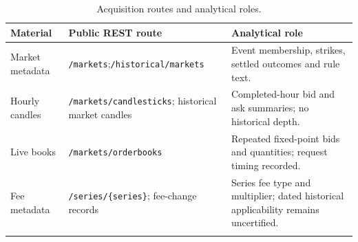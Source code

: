 \begin{table}[htbp]\centering
{\fontsize{10}{12}\selectfont\renewcommand{\arraystretch}{1.18}\setlength{\tabcolsep}{4pt}
\begin{tabularx}{\linewidth}{@{}L{27mm}L{63mm}X@{}}\toprule{}
\textbf{Material} & \textbf{Public REST route} & \textbf{Analytical role} \\ \midrule
Market metadata & \texttt{/markets};\newline\texttt{/historical/markets} & Event membership, strikes, settled outcomes and rule text. \\ \hline
Hourly candles & \texttt{/markets/candlesticks}; historical market candles & Completed-hour bid and ask summaries; no historical depth. \\ \hline
Live books & \texttt{/markets/orderbooks} & Repeated fixed-point bids and quantities; request timing recorded. \\ \hline
Fee metadata & \texttt{/series/\{series\}}; fee-change records & Series fee type and multiplier; dated historical applicability remains uncertified. \\ \hline
{}\bottomrule\end{tabularx}}
\caption[Acquisition routes and analytical roles]{Acquisition routes and analytical roles.}\label{tab:sources}
\end{table}
